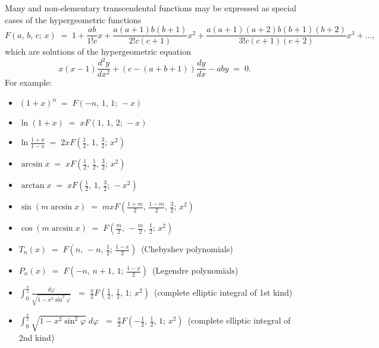 \documentclass[12pt]{article}
\theoremstyle{definition}
\begin{document}
Many  and non-elementary transcendental functions may be expressed as special cases of the hypergeometric functions
$$F(a,\,b,\,c;\,x) \;=\; 1+\frac{ab}{1!c}x+\frac{a(a+1)b(b+1)}{2!c(c+1)}x^2
+\frac{a(a+1)(a+2)b(b+1)(b+2)}{3!c(c+1)(c+2)}x^3+\ldots,$$
which are solutions of the hypergeometric equation
$$x(x-1)\frac{d^2y}{dx^2}+(c-(a+b+1))\frac{dy}{dx}-aby \;=\;0.$$
For example:
\begin{itemize}
\item $(1\!+\!x)^n \;=\; F(-n,\,1,\,1;\,-x)$
\item $\ln(1\!+\!x) \;=\; xF(1,\,1,\,2;\,-x)$
\item $\ln\frac{1+x}{1-x} \;=\; 2xF(\frac{1}{2},\,1,\,\frac{3}{2};\,x^2)$
\item $\arcsin{x} \;=\; xF(\frac{1}{2},\,\frac{1}{2},\,\frac{3}{2};\,x^2)$
\item $\arctan{x} \;=\; xF(\frac{1}{2},\,1,\,\frac{3}{2};\,-x^2)$
\item $\sin(m\arcsin{x}) \;=\; mxF(\frac{1+m}{2},\,\frac{1-m}{2},\,\frac{3}{2};\,x^2)$
\item $\cos(m\arcsin{x}) \;=\; F(\frac{m}{2},\,-\frac{m}{2},\,\frac{1}{2};\,x^2)$
\item $T_n(x) \;=\; F(n,\,-n,\,\frac{1}{2};\,\frac{1-x}{2})$\, (Chebyshev polynomials)
\item $P_n(x) \;=\; F(-n,\,n+1,\,1;\,\frac{1-x}{2})$\, (Legendre polynomials)
\item $\displaystyle\int_0^{\frac{\pi}{2}}\!\frac{d\varphi}{\sqrt{1\!-\!x^2\sin^2\varphi}}$ 
$\;=\; \frac{\pi}{2}F(\frac{1}{2},\,\frac{1}{2},\,1;\,x^2)$\, (complete elliptic integral of 1st kind)
\item $\displaystyle\int_0^{\frac{\pi}{2}}\!\sqrt{1\!-\!x^2\sin^2\varphi}\;d\varphi$ 
$\;=\; \frac{\pi}{2}F(-\frac{1}{2},\,\frac{1}{2},\,1;\,x^2)$\, (complete elliptic integral of 2nd kind)
\end{itemize}
\end{document}
